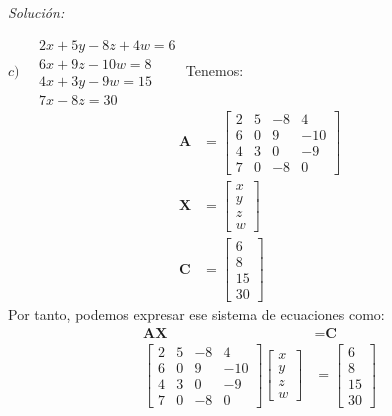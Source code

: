 \documentclass[12pt]{article}
\newenvironment{sol}
    {\emph{Solución:}
    }
    {
    }
\begin{document}
\begin{sol}
$
c) \quad
\begin{matrix}
2x+5y-8z+4w = 6\\
6x + 9z -10w =8 \\
4x +3y -9w = 15 \\
7x - 8z =30
\end{matrix}
$
Tenemos:
\begin{align*}
\textbf{A} &=
\begin{bmatrix}
2 & 5 & -8 & 4 \\ 
6 & 0 & 9 & -10 \\
4 & 3 & 0 & -9 \\
7 & 0 & -8 & 0
\end{bmatrix} 
\\
\textbf{X} &=
\begin{bmatrix}
x \\
y\\
z\\
w
\end{bmatrix}
\\
\textbf{C} &= 
\begin{bmatrix}
6\\
8\\
15\\
30
\end{bmatrix}
\end{align*}
Por tanto, podemos expresar ese sistema de ecuaciones como: 
\begin{align*}
\textbf{AX} &= \textbf{C} \\
\begin{bmatrix}
2 & 5 & -8 & 4 \\ 
6 & 0 & 9 & -10 \\
4 & 3 & 0 & -9 \\
7 & 0 & -8 & 0
\end{bmatrix}  
\begin{bmatrix}
x \\
y\\
z\\
w
\end{bmatrix}
&=
\begin{bmatrix}
6\\
8\\
15\\
30
\end{bmatrix}
\end{align*}

\end{sol}






\end{document}
